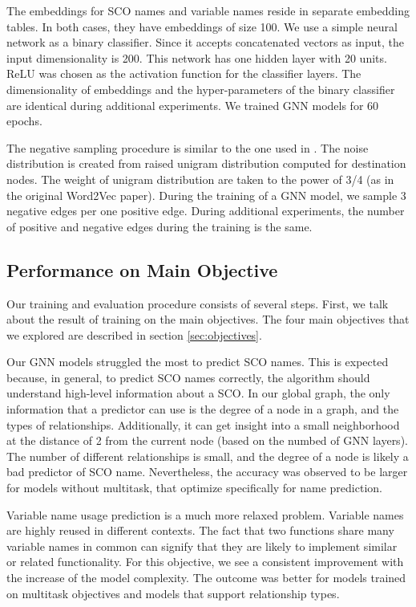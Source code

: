 \documentclass[a4paper,twoside]{article}
\begin{document}
The embeddings for SCO names and variable names reside in separate embedding tables. In both cases, they have embeddings of size 100. We use a simple neural network as a binary classifier. Since it accepts concatenated vectors as input, the input dimensionality is 200. This network has one hidden layer with 20 units. ReLU was chosen as the activation function for the classifier layers. The dimensionality of embeddings and the hyper-parameters of the binary classifier are identical during additional experiments. We trained GNN models for 60 epochs.

The negative sampling procedure is similar to the one used in \cite{mikolov2013distributed}. The noise distribution is created from raised unigram distribution computed for destination nodes. The weight of unigram distribution are taken to the power of 3/4 (as in the original Word2Vec paper). During the training of a GNN model, we sample 3 negative edges per one positive edge. During additional experiments, the number of positive and negative edges during the training is the same.

\subsection{Performance on Main Objective}

Our training and evaluation procedure consists of several steps. First, we talk about the result of training on the main objectives. The four main objectives that we explored are described in section \ref{sec:objectives}. 

Our GNN models struggled the most to predict SCO names. This is expected because, in general, to predict SCO names correctly, the algorithm should understand high-level information about a SCO\@. In our global graph, the only information that a predictor can use is the degree of a node in a graph, and the types of relationships. Additionally, it can get insight into a small neighborhood at the distance of 2 from the current node (based on the numbed of GNN layers). The number of different relationships is small, and the degree of a node is likely a bad predictor of SCO name. Nevertheless, the accuracy was observed to be larger for models without multitask, that optimize specifically for name prediction.

Variable name usage prediction is a much more relaxed problem. Variable names are highly reused in different contexts. The fact that two functions share many variable names in common can signify that they are likely to implement similar or related functionality. For this objective, we see a consistent improvement with the increase of the model complexity. The outcome was better for models trained on multitask objectives and models that support relationship types.
\end{document}
